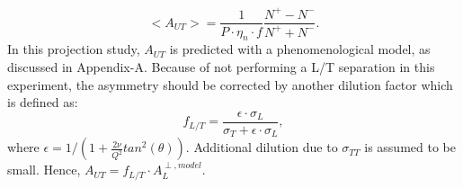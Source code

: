\begin{equation}
   <A_{UT}> = \frac{1}{P\cdot\eta_{n}\cdot f} \frac{N^{+}-N^{-}}{N^{+}+N^{-}}.
   \label{asym_exp}
\end{equation}
In this projection study, $A_{UT}$ is predicted with a phenomenological model, as discussed in Appendix-A. Because of not
performing a L/T separation in this experiment, the asymmetry should be
corrected by another dilution factor which is defined as:
\begin{equation}
  f_{L/T} =\frac{\epsilon\cdot\sigma_{L} }{\sigma_{T}+\epsilon\cdot\sigma_{L} },
\end{equation} 
where $\epsilon=1/(1+\frac{2\nu}{Q^{2}}tan^{2}(\theta))$. Additional dilution due to $\sigma_{TT}$ is assumed to be small. 
Hence, $A_{UT} = f_{L/T}\cdot A_{L}^{\perp,model}$.

